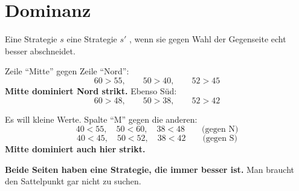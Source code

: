 \section{Dominanz}

\begin{definition}
Eine Strategie $s$  eine Strategie $s'$ , wenn sie gegen  Wahl der Gegenseite echt besser abschneidet.
\end{definition}

\begin{merksatz}
Zeile \enquote{Mitte} gegen Zeile \enquote{Nord}:
\[ 60 > 55, \qquad 50 > 40, \qquad 52 > 45 \]
\textbf{Mitte dominiert Nord strikt.} Ebenso Süd:
\[ 60 > 48, \qquad 50 > 38, \qquad 52 > 42 \]

Es will kleine Werte. Spalte \enquote{M} gegen die anderen:
\[ 40 < 55, \quad 50 < 60, \quad 38 < 48 \qquad\text{(gegen N)} \]
\[ 40 < 45, \quad 50 < 52, \quad 38 < 42 \qquad\text{(gegen S)} \]
\textbf{Mitte dominiert auch hier strikt.}

\begin{center}
\begin{minipage}{0.9\textwidth}
\textbf{Beide Seiten haben eine Strategie, die immer besser ist.} Man braucht den Sattelpunkt gar nicht zu suchen.
\end{minipage}
\end{center}

\begin{center}
\begin{minipage}{0.88\textwidth}
\end{minipage}
\end{center}
\end{merksatz}

